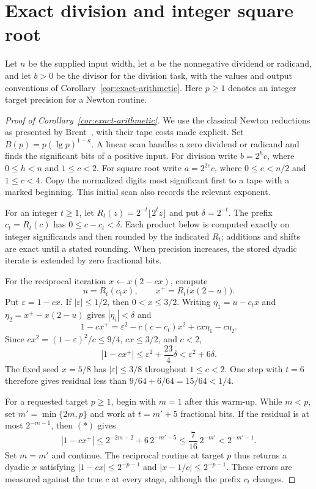 \section{Exact division and integer square root}
\label{sec:exact-arithmetic-proof}

Let $n$ be the supplied input width, let $a$ be the nonnegative dividend
or radicand, and let $b>0$ be the divisor for the division task, with
the values and output conventions of Corollary~\ref{cor:exact-arithmetic}.
Here $p\ge1$ denotes an integer target precision for a Newton routine.

\begin{proof}[Proof of Corollary~\ref{cor:exact-arithmetic}]
We use the classical Newton reductions as presented by
Brent~\cite[Lemmas 2.1--2.4]{Brent1976}, with their tape costs made
explicit. Set $B(p)=p(\lg p)^{1-\kappa}$. A linear scan handles a zero
dividend or radicand and finds the significant bits of a positive input.
For division write $b=2^h c$, where $0\le h<n$ and $1\le c<2$.
For square root write $a=2^{2e}c$, where $0\le e<n/2$ and $1\le c<4$.
Copy the normalized digits most significant first to a tape with a marked
beginning. This initial scan also records the relevant exponent.

For an integer $t\ge1$, let
$R_t(z)=2^{-t}\lfloor 2^t z\rfloor$ and put $\delta=2^{-t}$.
The prefix $c_t=R_t(c)$ has $0\le c-c_t<\delta$.
Each product below is computed exactly on integer significands and
then rounded by the indicated $R_t$; additions and shifts are exact
until a stated rounding. When precision increases, the stored dyadic
iterate is extended by zero fractional bits.

For the reciprocal iteration $x\leftarrow x(2-cx)$, compute
\[
 u=R_t(c_t x),\qquad x^+=R_t\bigl(x(2-u)\bigr).
\]
Put $\varepsilon=1-cx$. If $|\varepsilon|\le1/2$, then
$0<x\le3/2$. Writing $\eta_1=u-c_t x$ and
$\eta_2=x^+-x(2-u)$ gives $|\eta_i|<\delta$ and
\[
 1-cx^+
 =\varepsilon^2-c(c-c_t)x^2+cx\eta_1-c\eta_2.
\]
Since $cx^2=(1-\varepsilon)^2/c\le9/4$, $cx\le3/2$, and $c<2$,
\[
 |1-cx^+|
 \le\varepsilon^2+\frac{23}{4}\delta
 <\varepsilon^2+6\delta.                                  \tag{*}
\]
The fixed seed $x=5/8$ has $|\varepsilon|\le3/8$ throughout
$1\le c<2$. One step with $t=6$ therefore gives residual less than
$9/64+6/64=15/64<1/4$.

For a requested target $p\ge1$, begin with $m=1$ after this warm-up.
While $m<p$, set $m'=\min\{2m,p\}$ and work at $t=m'+5$ fractional
bits. If the residual is at most $2^{-m-1}$, then $(*)$ gives
\[
 |1-cx^+|
 \le2^{-2m-2}+6\,2^{-m'-5}
 \le\frac7{16}\,2^{-m'}<2^{-m'-1}.
\]
Set $m=m'$ and continue. The reciprocal routine at target $p$ thus
returns a dyadic $x$ satisfying
$|1-cx|\le2^{-p-1}$ and $|x-1/c|\le2^{-p-1}$.
These errors are measured against the true $c$ at every stage, although
the prefix $c_t$ changes.


\end{proof}
